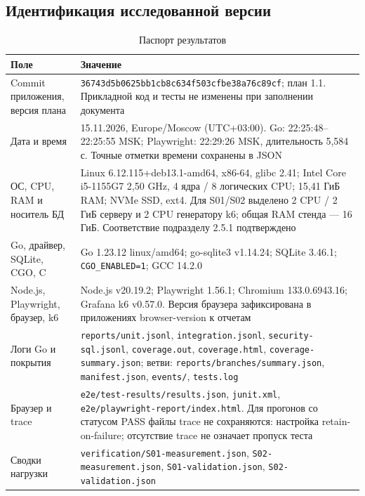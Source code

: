 \documentclass[12pt,a4paper]{extarticle}
\newcommand{\code}[1]{\nolinkurl{#1}}
\begin{document}
\subsection{Идентификация исследованной версии}
\begin{longtable}{|P{54mm}|P{98mm}|}
\caption{Паспорт результатов}\\\hline
Поле & Значение \\\hline
Commit приложения, версия плана & \code{36743d5b0625bb1cb8c634f503cfbe38a76c89cf}; план 1.1.
Прикладной код и тесты не изменены при заполнении документа \\\hline
Дата и время & 15.11.2026, Europe/Moscow (UTC+03:00).
Go: 22:25:48--22:25:55 MSK; Playwright: 22:29:26 MSK,
длительность 5,584 с. Точные отметки времени сохранены в JSON \\\hline
ОС, CPU, RAM и носитель БД & Linux 6.12.115+deb13.1-amd64,
x86-64, glibc 2.41; Intel Core i5-1155G7 2,50 GHz,
4 ядра / 8 логических CPU; 15,41 ГиБ RAM; NVMe SSD, ext4.
Для S01/S02 выделено 2 CPU / 2 ГиБ серверу и 2 CPU генератору k6;
общая RAM стенда --- 16 ГиБ. Соответствие подразделу 2.5.1 подтверждено \\\hline
Go, драйвер, SQLite, CGO, C & Go 1.23.12 linux/amd64;
go-sqlite3 v1.14.24; SQLite 3.46.1; \code{CGO_ENABLED=1}; GCC 14.2.0 \\\hline
Node.js, Playwright, браузер, k6 & Node.js v20.19.2;
Playwright 1.56.1; Chromium 133.0.6943.16; Grafana k6 v0.57.0.
Версия браузера зафиксирована в приложениях browser-version к отчетам \\\hline
Логи Go и покрытия & \code{reports/unit.jsonl}, \code{integration.jsonl},
\code{security-sql.jsonl}, \code{coverage.out}, \code{coverage.html},
\code{coverage-summary.json}; ветви: \code{reports/branches/summary.json},
\code{manifest.json}, \code{events/}, \code{tests.log} \\\hline
Браузер и trace & \code{e2e/test-results/results.json}, \code{junit.xml},
\code{e2e/playwright-report/index.html}. Для прогонов со статусом PASS файлы trace не сохраняются:
настройка retain-on-failure; отсутствие trace не означает пропуск теста \\\hline
Сводки нагрузки & \code{verification/S01-measurement.json},
\code{S02-measurement.json}, \code{S01-validation.json},
\code{S02-validation.json} \\\hline
\end{longtable}
\end{document}
